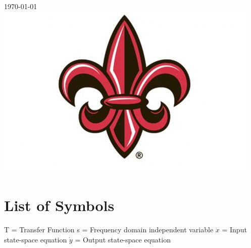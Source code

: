 \documentclass[12pt]{article}
\begin{document}
\begin{titlepage}


{\textsc{\large \today}}\\[2cm] %


\includegraphics[width=5in]{UL_logo.jpg}\\[1cm] %
 

\vfill %

\end{titlepage}


\tableofcontents

\listoffigures

\section*{\fontsize{12}{12}\selectfont \large List of Symbols}
T = Transfer Function
s = Frequency domain independent variable
$\dot{x}$ = Input state-space equation
$\dot{y}$ = Output state-space equation
\end{document}
